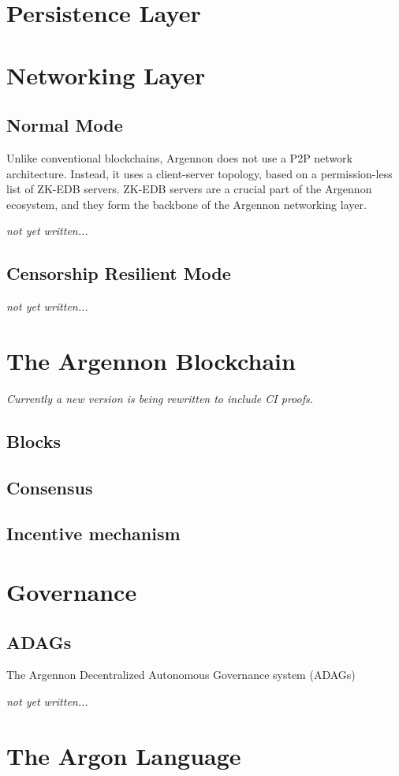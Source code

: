 \documentclass[11pt, a4paper]{report}
\newcommand{\note}[1] {
    \begin{tcolorbox}[colframe=white,colback=white]
        \emph{#1}
    \end{tcolorbox}
}
\begin{document}
    \chapter{Persistence Layer}\label{ch:persistance}
    


    \chapter{Networking Layer}\label{ch:networking}


    \section{Normal Mode}\label{sec:normal-mode}
    Unlike conventional blockchains, Argennon does not use a P2P network architecture. Instead, it uses a
    client-server topology, based on a permission-less list of ZK-EDB servers. ZK-EDB servers are a
    crucial part of the Argennon ecosystem, and they form the backbone of the Argennon networking layer.
    \note{not yet written...}


    \section{Censorship Resilient Mode}\label{sec:cens-res-mode}
    \note{not yet written...}


    \chapter{The Argennon Blockchain}\label{ch:argennon-blockchain}
    \note{Currently a new version is being rewritten to include CI proofs.}

    \section{Blocks}\label{sec:blocks}
    


    \section{Consensus}\label{sec:consensus}
    

    


    \section{Incentive mechanism}\label{sec:incentive-mechanism}
    


    \chapter{Governance}\label{ch:governance}


    \section{ADAGs}\label{sec:adags}
    The Argennon Decentralized Autonomous Governance system (ADAGs)
    \note{not yet written...}


    \chapter{The Argon Language}\label{ch:argon-lang}
    
\end{document}
